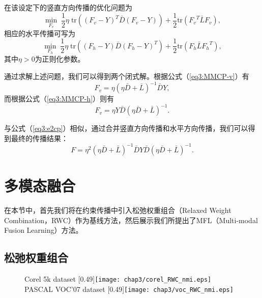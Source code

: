 在该设定下的竖直方向传播的优化问题为
\begin{equation}
\mathop{\mathrm{min}}_{{F_v}}\; \frac{1}{2}\eta\; \mathrm{tr}(({F_v}-{Y})^T\bar{{D}}({F_v}-{Y})) +\frac{1}{2}\mathrm{tr}({F_v}^T \bar{{L}}{F_v}),
\label{eq3:MMCP-v}
\end{equation}
相应的水平传播可写为
\begin{equation}
\mathop{\mathrm{min}}_{{F_h}}\;\frac{1}{2}\eta \;\mathrm{tr}( ({F_h}-{Y})\bar{{D}}({F_h}-{Y})^T)+\frac{1}{2}\mathrm{tr}({F_h} \bar{{L}}{F_h}^T),
\label{eq3:MMCP-h}
\end{equation}
其中$ \eta > 0  $为正则化参数。

通过求解上述问题，我们可以得到两个闭式解。根据公式（\ref{eq3:MMCP-v}）有
\begin{equation}
{F_v} = \eta(\eta \bar{{D}}+\bar{{L}})^{-1}\bar{{D}}{Y},
\label{eq3:sol-v}
\end{equation}
而根据公式（\ref{eq3:MMCP-h}）则有
\begin{equation}
{F_v} = \eta {Y}\bar{{D}}(\eta \bar{{D}}+\bar{{L}})^{-1}.
\label{eq3:sol-h}
\end{equation}

与公式（\ref{eq3:e2cp}）相似，通过合并竖直方向传播和水平方向传播，我们可以得到最终的传播结果：
\begin{equation}
{F} = \eta^2(\eta\bar{{D}}+\bar{{L}})^{-1}{\bar{{D}} Y\bar{{D}}}(\eta\bar{{D}}+\bar{{L}})^{-1}.
\label{}
\end{equation}

\section{多模态融合}
在本节中，首先我们将在约束传播中引入松弛权重组合（Relaxed Weight Combination，RWC）作为基线方法，然后展示我们所提出了MFL（Multi-modal Fusion Learning）方法。
\subsection{松弛权重组合}
\label{sec3:rwc}

\begin{figure}[t]
	\centering
					{Corel 5k dataset}
					[0.49\textwidth]{\texttt{[image: chap3/corel\_RWC\_nmi.eps]}
                    \label{fig3:rwc_corel}}
					{PASCAL VOC'07 dataset}
					[0.49\textwidth]{\texttt{[image: chap3/voc\_RWC\_nmi.eps]}
                    \label{fig3:rwc_voc}}
	\label{fig3:rwc}
\end{figure}

